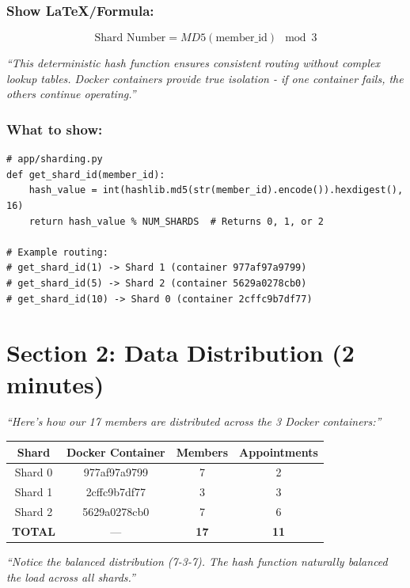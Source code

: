 \documentclass[12pt]{article}
\begin{document}
\subsubsection*{Show LaTeX/Formula:}

$$\text{Shard Number} = MD5(\text{member\_id}) \mod 3$$

\textit{``This deterministic hash function ensures consistent routing without complex lookup tables. Docker containers provide true isolation - if one container fails, the others continue operating.''}

\subsubsection*{What to show:}
\begin{lstlisting}
# app/sharding.py
def get_shard_id(member_id):
    hash_value = int(hashlib.md5(str(member_id).encode()).hexdigest(), 16)
    return hash_value % NUM_SHARDS  # Returns 0, 1, or 2

# Example routing:
# get_shard_id(1) -> Shard 1 (container 977af97a9799)
# get_shard_id(5) -> Shard 2 (container 5629a0278cb0)
# get_shard_id(10) -> Shard 0 (container 2cffc9b7df77)
\end{lstlisting}

\section{Section 2: Data Distribution (2 minutes)}

\textit{``Here's how our 17 members are distributed across the 3 Docker containers:''}

\begin{table}[h]
\centering
\begin{tabular}{|c|c|c|c|}
\hline
\textbf{Shard} & \textbf{Docker Container} & \textbf{Members} & \textbf{Appointments} \\
\hline
Shard 0 & 977af97a9799 & 7 & 2 \\
Shard 1 & 2cffc9b7df77 & 3 & 3 \\
Shard 2 & 5629a0278cb0 & 7 & 6 \\
\hline
\textbf{TOTAL} & — & \textbf{17} & \textbf{11} \\
\hline
\end{tabular}
\end{table}

\textit{``Notice the balanced distribution (7-3-7). The hash function naturally balanced the load across all shards.''}
\end{document}
